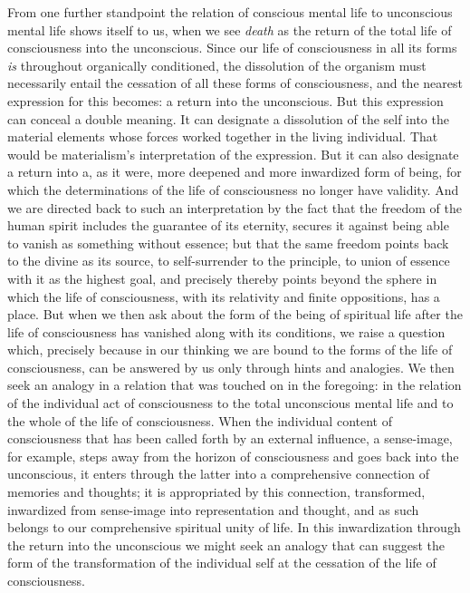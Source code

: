 \documentclass[12pt,a4paper,openany]{book}
\newcommand{\opage}[1]{\marginnote{\footnotesize\textit{[#1]}}}
\begin{document}
From one further standpoint the relation of conscious mental life to
unconscious mental life shows itself to us, when we see \emph{death}
as the return of the total life of consciousness into the unconscious.
Since our life of consciousness in all its forms \emph{is} throughout
organically conditioned, the dissolution of the organism must
necessarily entail the cessation of all these forms of consciousness,
and the nearest expression for this becomes: a return into the
unconscious.
\opage{56}But this expression can conceal a double meaning. It can
designate a dissolution of the self into the material elements whose
forces worked together in the living individual. That would be
materialism's interpretation of the expression. But it can also
designate a return into a, as it were, more deepened and more
inwardized form of being, for which the determinations of the life of
consciousness no longer have validity. And we are directed back to
such an interpretation by the fact that the freedom of the human
spirit includes the guarantee of its eternity, secures it against
being able to vanish as something without essence; but that the same
freedom points back to the divine as its source, to self-surrender to
the principle, to union of essence with it as the highest goal, and
precisely thereby points beyond the sphere in which the life of
consciousness, with its relativity and finite oppositions, has a
place. But when we then ask about the form of the being of spiritual
life after the life of consciousness has vanished along with its
conditions, we raise a question which, precisely because in our
thinking we are bound to the forms of the life of consciousness, can
be answered by us only through hints and analogies. We then seek an
analogy in a relation that was touched on in the foregoing: in the
relation of the individual act of consciousness to the total
unconscious mental life and to the whole of the life of consciousness.
When the individual content of consciousness that has been called
forth by an external influence, a sense-image, for example, steps away
from the horizon of consciousness and goes back into the unconscious,
it enters through the latter into a comprehensive connection of
memories and thoughts; it is appropriated by this connection,
transformed, inwardized from sense-image into representation and
thought, and as such belongs to our comprehensive spiritual unity of
life. In this inwardization through the return into the unconscious we
might seek an analogy that can suggest the form of the transformation
of the individual self at the cessation of the life of consciousness.
\end{document}
